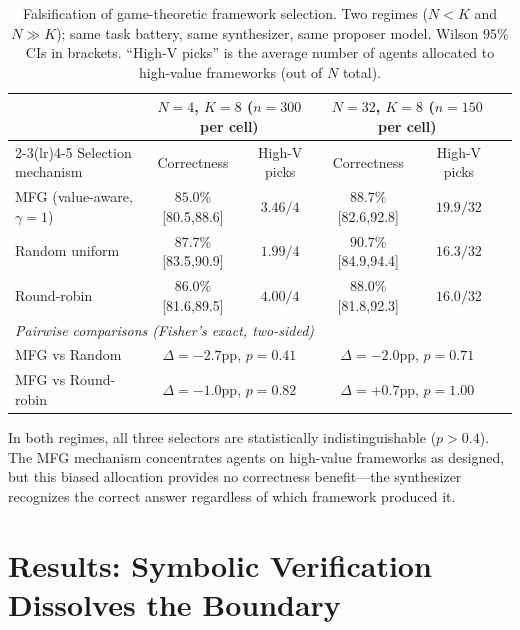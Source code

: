 \documentclass[11pt]{amsart}
\newcommand{\g}{\gamma}
\newcommand\1{{\mathds{1}}}
\theoremstyle{definition}
\theoremstyle{remark}
\numberwithin{equation}{section}
\begin{document}
\begin{table}[h]
\centering\small
\caption{Falsification of game-theoretic framework selection. Two regimes ($N\!<\!K$ and $N\!\gg\!K$); same task battery, same synthesizer, same proposer model. Wilson $95\%$ CIs in brackets. ``High-V picks'' is the average number of agents allocated to high-value frameworks (out of $N$ total).}
\label{tab:falsification}
\begin{tabular}{lccccc}
\toprule
& \multicolumn{2}{c}{$N\!=\!4$, $K\!=\!8$ ($n\!=\!300$ per cell)} & \multicolumn{2}{c}{$N\!=\!32$, $K\!=\!8$ ($n\!=\!150$ per cell)} \\
\cmidrule(lr){2-3}\cmidrule(lr){4-5}
Selection mechanism & Correctness & High-V picks & Correctness & High-V picks \\
\midrule
MFG (value-aware, $\g\!=\!1$) & $85.0\%$ {\scriptsize[80.5,88.6]} & $3.46/4$ & $88.7\%$ {\scriptsize[82.6,92.8]} & $19.9/32$ \\
Random uniform                  & $87.7\%$ {\scriptsize[83.5,90.9]} & $1.99/4$ & $90.7\%$ {\scriptsize[84.9,94.4]} & $16.3/32$ \\
Round-robin                     & $86.0\%$ {\scriptsize[81.6,89.5]} & $4.00/4$ & $88.0\%$ {\scriptsize[81.8,92.3]} & $16.0/32$ \\
\midrule
\multicolumn{5}{l}{\emph{Pairwise comparisons (Fisher's exact, two-sided)}} \\
MFG vs Random      & \multicolumn{2}{c}{$\Delta\!=\!{-2.7}$pp, $p\!=\!0.41$} & \multicolumn{2}{c}{$\Delta\!=\!{-2.0}$pp, $p\!=\!0.71$} \\
MFG vs Round-robin & \multicolumn{2}{c}{$\Delta\!=\!{-1.0}$pp, $p\!=\!0.82$} & \multicolumn{2}{c}{$\Delta\!=\!{+0.7}$pp, $p\!=\!1.00$} \\
\bottomrule
\end{tabular}
\end{table}

In both regimes, all three selectors are statistically indistinguishable ($p > 0.4$).
The MFG mechanism concentrates agents on high-value frameworks as designed, but this biased allocation provides no correctness benefit---the synthesizer recognizes the correct answer regardless of which framework produced it.

\section{Results: Symbolic Verification Dissolves the Boundary}\label{sec:act2}
\end{document}
